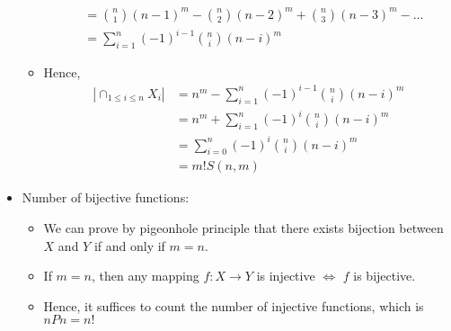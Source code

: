 \documentclass{article}
\begin{document}
\begin{itemize}
\begin{itemize}
\begin{align*}
			&=\binom{n}{1}(n-1)^m-\binom{n}{2}(n-2)^m+\binom{n}{3}(n-3)^m-\dots\\
			&=\sum_{i=1}^{n}(-1)^{i-1}\binom{n}{i}(n-i)^m
		\end{align*}
		\item Hence, \begin{align*}
			|\cap_{1\leq i\leq n}X_i|&=n^m-\sum_{i=1}^{n}(-1)^{i-1}\binom{n}{i}(n-i)^m\\
			&=n^m+\sum_{i=1}^{n}(-1)^{i}\binom{n}{i}(n-i)^m\\
			&=\sum_{i=0}^{n}(-1)^{i}\binom{n}{i}(n-i)^m\\
			&=m!S(n,m)
		\end{align*}
	\end{itemize}
	\item Number of bijective functions:
	\begin{itemize}
		\item We can prove by pigeonhole principle that there exists bijection between $X$ and $Y$ if and only if $m=n$.
		\item If $m=n$, then any mapping $f:X\rightarrow Y$ is injective $\iff$ $f$ is bijective.
		\item Hence, it suffices to count the number of injective functions, which is $nPn=n!$
	\end{itemize}
\end{itemize}
\end{document}
